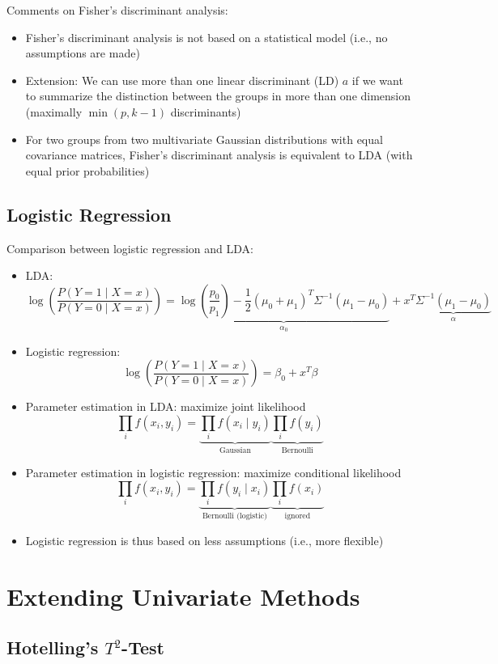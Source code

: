 \documentclass[a4paper]{article}
\begin{document}
Comments on Fisher's discriminant analysis:
\begin{itemize}
    \item Fisher's discriminant analysis is not based on a statistical model (i.e., no assumptions are made)
    \item Extension: We can use more than one linear discriminant (LD) $a$ if we want to summarize the distinction between the groups in more than one dimension (maximally $\min(p,k-1)$ discriminants)
    \item For two groups from two multivariate Gaussian distributions with equal covariance matrices, Fisher's discriminant analysis is equivalent to LDA (with equal prior probabilities)
\end{itemize}

\subsection{Logistic Regression}

Comparison between logistic regression and LDA:
\begin{itemize}
    \item LDA:
    \[\log\left(\frac{P(Y=1\mid X=x)}{P(Y=0\mid X=x)} \right)=
    \underbrace{\log\left(\frac{p_0}{p_1}\right)-\frac{1}{2}(\mu_0+\mu_1)^T\Sigma^{-1}(\mu_1-\mu_0)}_{\alpha_0}+
    x^T \underbrace{\Sigma^{-1}(\mu_1-\mu_0)}_{\alpha} \]
    \item Logistic regression:
    \[\log\left(\frac{P(Y=1\mid X=x)}{P(Y=0\mid X=x)} \right)=\beta_0+x^T\beta \]
    \item Parameter estimation in LDA: maximize joint likelihood
    \[\prod_{i}f(x_i,y_i)=\underbrace{\prod_{i}f(x_i\mid y_i)}_\text{Gaussian}\underbrace{\prod_{i}f(y_i)}_\text{Bernoulli} \]
    \item Parameter estimation in logistic regression: maximize conditional likelihood
    \[\prod_i f(x_i,y_i)=\underbrace{\prod_i f(y_i\mid x_i)}_\text{Bernoulli (logistic)}
    \underbrace{\prod_i f(x_i)}_\text{ignored} \]
    \item Logistic regression is thus based on less assumptions (i.e., more flexible)
\end{itemize}


\section{Extending Univariate Methods}

\subsection{Hotelling's $T^2$-Test}
\end{document}
